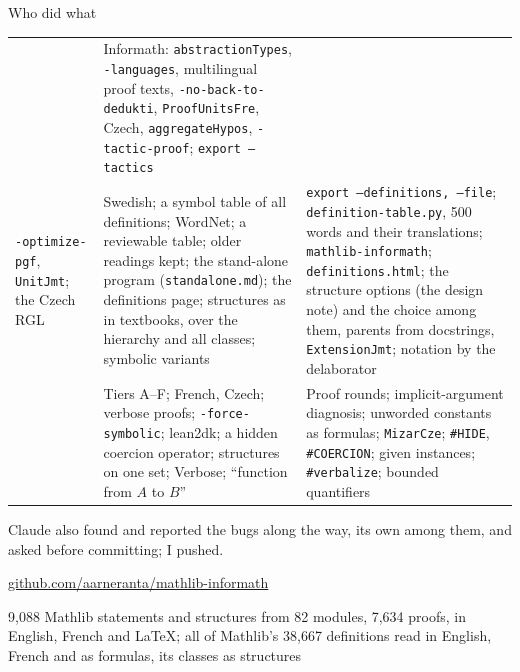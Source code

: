 \documentclass[10pt,aspectratio=169]{beamer}
\begin{document}
\begin{frame}{Who did what}
\begin{tabularx}{\textwidth}{@{}>{\raggedright\arraybackslash}X>{\raggedright\arraybackslash}X>{\raggedright\arraybackslash}X@{}}
    &
    Informath: \texttt{abstractionTypes}, \texttt{-languages},
    multilingual proof texts, \texttt{-no-back-to-dedukti},
    \texttt{ProofUnitsFre}, Czech, \texttt{aggregateHypos}, \texttt{-tactic-proof}; \texttt{export --tactics} \\
    \texttt{-optimize-pgf}, \texttt{UnitJmt}; the Czech RGL
    &
    Swedish; a symbol table of all definitions; WordNet; a reviewable table; older
    readings kept; the stand-alone program (\texttt{standalone.md}); the definitions page;
    structures as in textbooks, over the hierarchy and all classes; symbolic variants
    &
    \texttt{export --definitions, --file}; \texttt{definition-table.py}, 500 words and
    their translations; \texttt{mathlib-informath}; \texttt{definitions.html}; the structure
    options (the design note) and the choice among them, parents from docstrings, \texttt{ExtensionJmt}; notation by the
    delaborator \\
    &
    Tiers A--F; French, Czech; verbose proofs; \texttt{-force-symbolic}; lean2dk; a hidden
    coercion operator; structures on one set; Verbose; ``function from $A$ to $B$''
    &
    Proof rounds; implicit-argument diagnosis; unworded constants as formulas;
    \texttt{MizarCze}; \texttt{\#HIDE}, \texttt{\#COERCION}; given instances;
    \texttt{\#verbalize}; bounded quantifiers \\
    \bottomrule
  \end{tabularx}

  Claude also found and reported the bugs along the way, its own among them, and asked before
  committing; I pushed.
\end{frame}

\begin{frame}[standout]
  \url{github.com/aarneranta/mathlib-informath}

  \vspace{3mm}
  \normalsize
  9,088 Mathlib statements and structures from 82 modules, 7,634 proofs, in English, French
  and LaTeX; all of Mathlib's 38,667 definitions read in English, French and as formulas,
  its classes as structures
\end{frame}
\end{document}
